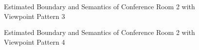 \documentclass[11pt, a4paper,oneside,chapterprefix=false]{scrbook}
\begin{document}
\begin{figure}[H]
    \centering
      \label{fig:conf2 b 200 5} \hfill
     \label{fig:conf2 s 200 5}
    \caption{Estimated Boundary and Semantics of Conference Room 2 with Viewpoint Pattern 3}
    \label{fig:conf2 5}
\end{figure}

\begin{figure}[H]
    \centering
      \label{fig:conf2 b 200 6} \hfill
     \label{fig:conf2 s 200 6}
    \caption{Estimated Boundary and Semantics of Conference Room 2 with Viewpoint Pattern 4}
    \label{fig:conf2 6}
\end{figure}
\end{document}
